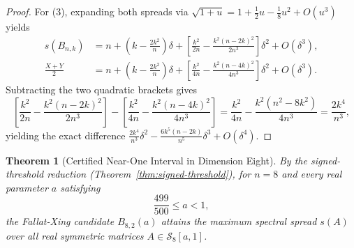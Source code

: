 \documentclass[11pt,reqno]{article}
\newtheorem{theorem}{Theorem}[section]
\theoremstyle{definition}
\begin{document}
\begin{proof}
For (3), expanding both spreads via $\sqrt{1+u} = 1 + \frac{1}{2}u - \frac{1}{8}u^2 + O(u^3)$ yields
\begin{align*}
s(B_{n, k}) &= n + \left(k - \frac{2k^2}{n}\right)\delta + \left[\frac{k^2}{2n} - \frac{k^2(n-2k)^2}{2n^3}\right]\delta^2 + O(\delta^3), \\
\frac{X+Y}{2} &= n + \left(k - \frac{2k^2}{n}\right)\delta + \left[\frac{k^2}{4n} - \frac{k^2(n-4k)^2}{4n^3}\right]\delta^2 + O(\delta^3).
\end{align*}
Subtracting the two quadratic brackets gives
\[
\left[\frac{k^2}{2n} - \frac{k^2(n-2k)^2}{2n^3}\right] - \left[\frac{k^2}{4n} - \frac{k^2(n-4k)^2}{4n^3}\right] = \frac{k^2}{4n} - \frac{k^2(n^2 - 8k^2)}{4n^3} = \frac{2k^4}{n^3},
\]
yielding the exact difference $\frac{2k^4}{n^3}\delta^2 - \frac{6k^5(n-2k)}{n^5}\delta^3 + O(\delta^4)$.
\end{proof}

\begin{theorem}[Certified Near-One Interval in Dimension Eight]\label{thm:near-one}
By the signed-threshold reduction (Theorem~\ref{thm:signed-threshold}), for $n=8$ and every real parameter $a$ satisfying
\begin{equation}
\frac{499}{500} \le a < 1,
\end{equation}
the Fallat-Xing candidate $B_{8, 2}(a)$ attains the maximum spectral spread $s(A)$ over all real symmetric matrices $A \in \mathcal{S}_8[a, 1]$.
\end{theorem}
\end{document}
